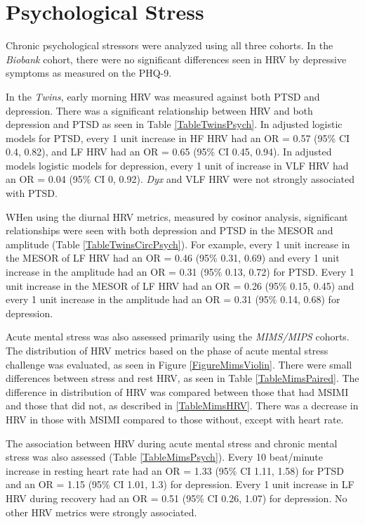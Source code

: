 \documentclass[
  11pt,
  openany]{book}
\begin{document}
\hypertarget{psychological-stress-1}{%
\chapter{Psychological Stress}\label{psychological-stress-1}}

Chronic psychological stressors were analyzed using all three cohorts.
In the \emph{Biobank} cohort, there were no significant differences seen in HRV by depressive symptoms as measured on the PHQ-9.

In the \emph{Twins}, early morning HRV was measured against both PTSD and depression.
There was a significant relationship between HRV and both depression and PTSD as seen in Table \ref{TableTwinsPsych}.
In adjusted logistic models for PTSD, every 1 unit increase in HF HRV had an OR = 0.57 (95\% CI 0.4, 0.82), and LF HRV had an OR = 0.65 (95\% CI 0.45, 0.94).
In adjusted models logistic models for depression, every 1 unit of increase in VLF HRV had an OR = 0.04 (95\% CI 0, 0.92).
\emph{Dyx} and VLF HRV were not strongly associated with PTSD.

WHen using the diurnal HRV metrics, measured by cosinor analysis, significant relationships were seen with both depression and PTSD in the MESOR and amplitude (Table \ref{TableTwinsCircPsych}).
For example, every 1 unit increase in the MESOR of LF HRV had an OR = 0.46 (95\% 0.31, 0.69) and every 1 unit increase in the amplitude had an OR = 0.31 (95\% 0.13, 0.72) for PTSD.
Every 1 unit increase in the MESOR of LF HRV had an OR = 0.26 (95\% 0.15, 0.45) and every 1 unit increase in the amplitude had an OR = 0.31 (95\% 0.14, 0.68) for depression.

Acute mental stress was also assessed primarily using the \emph{MIMS/MIPS} cohorts.
The distribution of HRV metrics based on the phase of acute mental stress challenge was evaluated, as seen in Figure \ref{FigureMimsViolin}.
There were small differences between stress and rest HRV, as seen in Table \ref{TableMimsPaired}.
The difference in distribution of HRV was compared between those that had MSIMI and those that did not, as described in \ref{TableMimsHRV}.
There was a decrease in HRV in those with MSIMI compared to those without, except with heart rate.

The association between HRV during acute mental stress and chronic mental stress was also assessed (Table \ref{TableMimsPsych}).
Every 10 beat/minute increase in resting heart rate had an OR = 1.33 (95\% CI 1.11, 1.58) for PTSD and an OR = 1.15 (95\% CI 1.01, 1.3) for depression.
Every 1 unit increase in LF HRV during recovery had an OR = 0.51 (95\% CI 0.26, 1.07) for depression.
No other HRV metrics were strongly associated.
\end{document}
